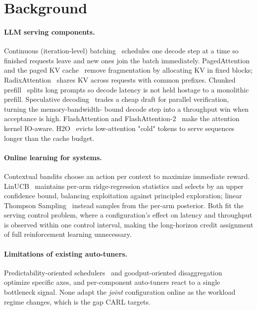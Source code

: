 \documentclass[10pt,twocolumn]{article}
\begin{document}
\section{Background}
\label{sec:background}

\paragraph{LLM serving components.} Continuous (iteration-level)
batching~\cite{yu2022orca} schedules one decode step at a time so finished
requests leave and new ones join the batch immediately. PagedAttention and the
paged KV cache~\cite{kwon2023vllm} remove fragmentation by allocating KV in
fixed blocks; RadixAttention~\cite{zheng2024sglang} shares KV across requests
with common prefixes. Chunked prefill~\cite{agrawal2023sarathi,
agrawal2024sarathiserve} splits long prompts so decode latency is not held
hostage to a monolithic prefill. Speculative decoding~\cite{leviathan2023speculative}
trades a cheap draft for parallel verification, turning the memory-bandwidth-
bound decode step into a throughput win when acceptance is high. FlashAttention
and FlashAttention-2~\cite{dao2022flashattention, dao2023flashattention2}
make the attention kernel IO-aware. H2O~\cite{zhang2023h2o} evicts low-attention
"cold" tokens to serve sequences longer than the cache budget.

\paragraph{Online learning for systems.} Contextual bandits choose an action per
context to maximize immediate reward. LinUCB~\cite{li2010contextual} maintains
per-arm ridge-regression statistics and selects by an upper confidence bound,
balancing exploitation against principled exploration; linear Thompson
Sampling~\cite{agrawal2013thompson} instead samples from the per-arm posterior.
Both fit the serving control problem, where a configuration's effect on latency
and throughput is observed within one control interval, making the long-horizon
credit assignment of full reinforcement learning unnecessary.

\paragraph{Limitations of existing auto-tuners.} Predictability-oriented
schedulers~\cite{gujarati2020clockwork} and goodput-oriented
disaggregation~\cite{zhong2024distserve, li2023alpaserve} optimize specific
axes, and per-component auto-tuners react to a single bottleneck signal. None
adapt the \emph{joint} configuration online as the workload regime changes,
which is the gap CARL targets.
\end{document}
